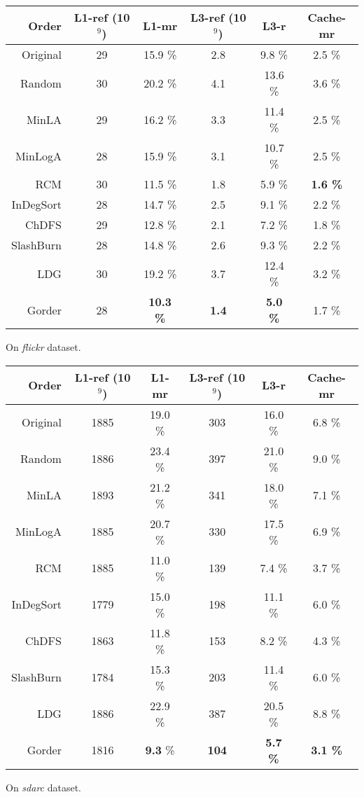 \begin{subtable}[t]{\linewidth}
\centering
\begin{tabular}{r||c|c|c|c|c}
Order & L1-ref (10$^9$) & L1-mr & L3-ref (10$^9$) & L3-r & Cache-mr \\ \hline
Original & 29 & 15.9 \% & 2.8 & 9.8 \% & 2.5 \% \\
Random & 30 & 20.2 \% & 4.1 & 13.6 \% & 3.6 \% \\
MinLA & 29 & 16.2 \% & 3.3 & 11.4 \% & 2.5 \% \\
MinLogA & 28 & 15.9 \% & 3.1 & 10.7 \% & 2.5 \% \\
RCM & 30 & 11.5 \% & 1.8 & 5.9 \% & \textbf{1.6 \%} \\
InDegSort & 28 & 14.7 \% & 2.5 & 9.1 \% & 2.2 \% \\
ChDFS & 29 & 12.8 \% & 2.1 & 7.2 \% & 1.8 \% \\
SlashBurn & 28 & 14.8 \% & 2.6 & 9.3 \% & 2.2 \% \\
LDG & 30 & 19.2 \% & 3.7 & 12.4 \% & 3.2 \% \\
Gorder & 28 & \textbf{10.3 \%} & \textbf{1.4} & \textbf{5.0 \%} & 1.7 \% \\
\end{tabular}
\caption{On \textit{flickr} dataset.}
\label{table-cache-flickr}\end{subtable}

\begin{subtable}[t]{\linewidth}
\centering
\begin{tabular}{r||c|c|c|c|c}
Order & L1-ref (10$^9$) & L1-mr & L3-ref (10$^9$) & L3-r & Cache-mr \\ \hline
Original & 1885 & 19.0 \% & 303 & 16.0 \% & 6.8 \% \\
Random & 1886 & 23.4 \% & 397 & 21.0 \% & 9.0 \% \\
MinLA & 1893 & 21.2 \% & 341 & 18.0 \% & 7.1 \% \\
MinLogA & 1885 & 20.7 \% & 330 & 17.5 \% & 6.9 \% \\
RCM & 1885 & 11.0 \% & 139 & 7.4 \% & 3.7 \% \\
InDegSort & 1779 & 15.0 \% & 198 & 11.1 \% & 6.0 \% \\
ChDFS & 1863 & 11.8 \% & 153 & 8.2 \% & 4.3 \% \\
SlashBurn & 1784 & 15.3 \% & 203 & 11.4 \% & 6.0 \% \\
LDG & 1886 & 22.9 \% & 387 & 20.5 \% & 8.8 \% \\
Gorder & 1816 & \textbf{9.3} \% & \textbf{104} & \textbf{5.7 \%} & \textbf{3.1 \%} \\
\end{tabular}
\caption{On \textit{sdarc} dataset.}
\label{table-cache-sdarc}\end{subtable}
